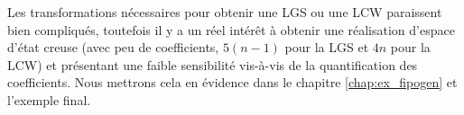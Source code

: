 \bigskip

Les transformations nécessaires pour obtenir une LGS ou une LCW paraissent bien compliqués, toutefois il y a un réel intérêt à obtenir une réalisation d'espace d'état creuse (avec peu de coefficients, $5(n-1)$ pour la LGS et $4n$ pour la LCW) et présentant une faible sensibilité vis-à-vis de la quantification des coefficients. Nous mettrons cela en évidence dans le chapitre \ref{chap:ex_fipogen} et l'exemple final.



